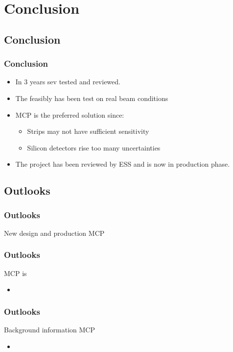 \section{Conclusion}

\subsection{Conclusion}
\begin{frame}
  \frametitle{Conclusion}
  \begin{itemize}
    \item In 3 years sev tested and reviewed.
    \item The feasibly has been test on real beam conditions
    \item MCP is the preferred solution since:
    \begin{itemize}
      \item Strips may not have sufficient sensitivity
      \item Silicon detectors rise too many uncertainties 
    \end{itemize}
    \item The project has been reviewed by ESS and is now in production phase.
  \end{itemize}
  
  \begin{block}{}    
  \end{block}

\end{frame}

\subsection{Outlooks}
\begin{frame}
  \frametitle{Outlooks}
  \begin{block}{New design and production}
    MCP
  \end{block}
\end{frame}

\begin{frame}
  \frametitle{Outlooks}
  \begin{block}{}
    MCP is
  \end{block}
  \begin{itemize}
    \item 
  \end{itemize}
\end{frame}

\begin{frame}
  \frametitle{Outlooks}
  \begin{block}{Background information}
    MCP
  \end{block}
  \begin{itemize}
    \item 
  \end{itemize}
\end{frame}